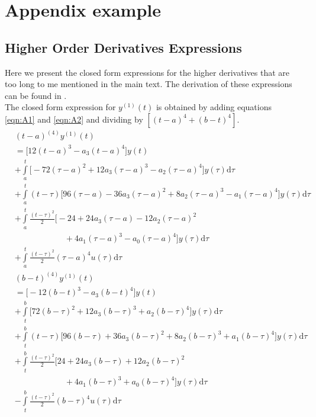 \documentclass[letterpaper%
, twoside%
, 12pt%
,memoire%
, english%
,creativecommons,hyperref%
]{thETS}
\begin{document}
\appendix

\multiannexe

% 

\chapter{Appendix example}


\section{Higher Order Derivatives Expressions} \label{Sec:App1}
Here we present the closed form expressions for the higher derivatives that are too long to me mentioned in the main text. The derivation of these expressions can be found in \citep{RN120}.\\
The closed form expression for $y^{(1)}(t)$ is obtained by adding equations \eqref{eqn:A1} and \eqref{eqn:A2} and dividing by $[(t-a)^{4}+(b-t)^{4}]$.
\begin{equation}\label{eqn:A1}
\begin{split}
	&(t-a)^{(4)}y^{(1)}(t)\\
	&=\bigg[ 12(t-a)^{3}-a_3(t-a)^{4}\bigg]y(t)\\
	&+\int\limits_{a}^{t}\bigg[-72(\tau-a)^{2}+12a_3(\tau-a)^{3}-a_2(\tau-a)^4\bigg]y(\tau)\mathrm{d}\tau\\
	&+\int\limits_{a}^{t}(t-\tau)\bigg[96(\tau-a)-36a_3(\tau-a)^{2}+8a_2(\tau-a)^{3}-a_1(\tau-a)^{4}\bigg]y(\tau)\mathrm{d}\tau\\
	&+\int\limits_{a}^{t}\frac{(t-\tau)^{2}}{2}\bigg[-24+24a_3(\tau-a)-12a_2(\tau-a)^{2}
	\\&\qquad\qquad\qquad{}+4a_1(\tau-a)^{3}-a_0(\tau-a)^{4}\bigg]y(\tau)\mathrm{d}\tau\\
	&+\int\limits_{a}^{t}\frac{(t-\tau)^{2}}{2}(\tau-a)^{4}u(\tau)\mathrm{d}\tau	
\end{split}
\end{equation}
\begin{equation}\label{eqn:A2}
\begin{split}
	&(b-t)^{(4)}y^{(1)}(t)\\
	&=\bigg[-12(b-t)^{3}-a_3(b-t)^{4} \bigg]y(t)\\
	&+\int\limits_{t}^{b}\bigg[72(b-\tau)^{2}+12a_3(b-\tau)^{3}+a_2(b-\tau)^4\bigg]y(\tau)\mathrm{d}\tau\\
	&+\int\limits_{t}^{b}(t-\tau)\bigg[96(b-\tau)+36a_3(b-\tau)^{2}+8a_2(b-\tau)^{3}+a_1(b-\tau)^{4}\bigg]y(\tau)\mathrm{d}\tau\\
	&+\int\limits_{t}^{b}\frac{(t-\tau)^{2}}{2}\bigg[24+24a_3(b-\tau)+12a_2(b-\tau)^{2}
	\\&\qquad\qquad\qquad{}+4a_1(b-\tau)^{3}+a_0(b-\tau)^{4}\bigg]y(\tau)\mathrm{d}\tau\\
	&-\int\limits_{t}^{b}\frac{(t-\tau)^{2}}{2}(b-\tau)^{4}u(\tau)\mathrm{d}\tau	
\end{split}
\end{equation}
\end{document}
